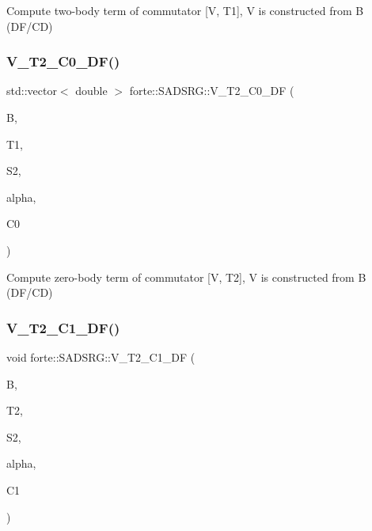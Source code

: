 Compute two-\/body term of commutator \mbox{[}V, T1\mbox{]}, V is constructed from B (D\+F/\+CD) 

\mbox{\label{classforte_1_1_s_a_d_s_r_g_a047a7d32f855329819af37ec1be6cff7}} 
\subsubsection{\texorpdfstring{V\+\_\+\+T2\+\_\+\+C0\+\_\+\+D\+F()}{V\_T2\_C0\_DF()}}
{\footnotesize\ttfamily std\+::vector$<$ double $>$ forte\+::\+S\+A\+D\+S\+R\+G\+::\+V\+\_\+\+T2\+\_\+\+C0\+\_\+\+DF (\begin{DoxyParamCaption}\item[{Blocked\+Tensor \&}]{B,  }\item[{Blocked\+Tensor \&}]{T1,  }\item[{Blocked\+Tensor \&}]{S2,  }\item[{const double \&}]{alpha,  }\item[{double \&}]{C0 }\end{DoxyParamCaption})\hspace{0.3cm}{\ttfamily [protected]}}



Compute zero-\/body term of commutator \mbox{[}V, T2\mbox{]}, V is constructed from B (D\+F/\+CD) 

\mbox{\label{classforte_1_1_s_a_d_s_r_g_af0953079e40984f5905e1c9e711b4315}} 
\subsubsection{\texorpdfstring{V\+\_\+\+T2\+\_\+\+C1\+\_\+\+D\+F()}{V\_T2\_C1\_DF()}}
{\footnotesize\ttfamily void forte\+::\+S\+A\+D\+S\+R\+G\+::\+V\+\_\+\+T2\+\_\+\+C1\+\_\+\+DF (\begin{DoxyParamCaption}\item[{Blocked\+Tensor \&}]{B,  }\item[{Blocked\+Tensor \&}]{T2,  }\item[{Blocked\+Tensor \&}]{S2,  }\item[{const double \&}]{alpha,  }\item[{Blocked\+Tensor \&}]{C1 }\end{DoxyParamCaption})\hspace{0.3cm}{\ttfamily [protected]}}



